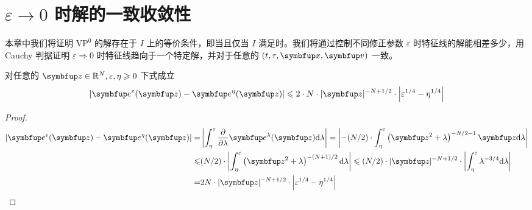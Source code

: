 \section{\texorpdfstring{$\varepsilon \rightarrow 0$}{Lg} 时解的一致收敛性}

本章中我们将证明 $\text{VP}^{0}$ 的解存在于 $I$ 上的等价条件，即当且仅当 $I$ 满足\boundcondition 时。我们将通过控制不同修正参数 $\varepsilon$ 时特征线的解能相差多少，用 Cauchy 判据证明 $\varepsilon\Rightarrow 0$ 时特征线趋向于一个特定解，并对于任意的 $(t,\tau,\vx,\vv)$ 一致。


\begin{lemma}
    对任意的 $\vect{z} \in \bbR^{N}, \varepsilon, \eta \geqslant 0$ 下式成立
\[
\left|\vect{e}^{\varepsilon}(\vect{z})-\vect{e}^{\eta}(\vect{z})\right| \leqslant 2 \cdot N \cdot|\vect{z}|^{-N+1 / 2} \cdot\left|\varepsilon^{1 / 4}-\eta^{1 / 4}\right|
\]
\end{lemma}

\begin{proof}
    \begin{equation}
        \begin{aligned}
            \left|\vect{e}^{\varepsilon}(\vect{z})-\vect{e}^{\eta}(\vect{z})\right|=&\left|\int_{\eta}^{\varepsilon} \frac{\partial}{\partial \lambda} \vect{e}^{\lambda}(\vect{z}) \mathrm{d} \lambda\right|=\left|-(N / 2) \cdot \int_{\eta}^{\varepsilon}\left(\vect{z}^{2}+\lambda\right)^{-N / 2-1} \vect{z} \mathrm{d} \lambda\right|\\
            \leqslant &(N / 2) \cdot\left|\int_{\eta}^{\varepsilon}\left(\vect{z}^{2}+\lambda\right)^{-(N+1) / 2} \mathrm{d} \lambda\right| \leqslant(N / 2) \cdot|\vect{z}|^{-N+1 / 2} \cdot\left|\int_{\eta}^{\varepsilon} \lambda^{-3 / 4} \mathrm{d} \lambda\right|\\
            = & 2N \cdot|\vect{z}|^{-N+1 / 2} \cdot\left|\varepsilon^{1 / 4}-\eta^{1 / 4}\right|
        \end{aligned}
    \end{equation}
\end{proof}

